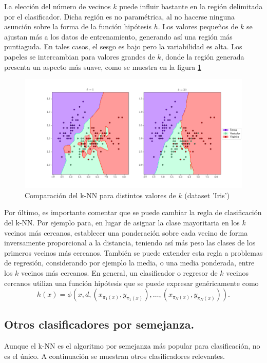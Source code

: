 \documentclass{book}
\begin{document}
La elección del número de vecinos $k$ puede influir bastante en la región delimitada por el clasificador. Dicha región es no paramétrica, al no hacerse ninguna asunción sobre la forma de la función hipótesis $h$. Los valores pequeños de $k$  se ajustan más a los datos de entrenamiento, generando así una región más puntiaguda. En tales casos, el sesgo es bajo pero la variabilidad es alta. Los papeles se intercambian para valores grandes de $k$, donde la región generada presenta un aspecto más suave, como se muestra en la figura \ref{fig:knn_comp_k}

\begin{figure}[h]
	\centering
	\includegraphics[width=\textwidth]{./images/compare_knn.png}
	\caption{Comparación del k-NN para distintos valores de $k$ (dataset 'Iris')} \label{fig:knn_comp_k}
\end{figure}

Por último, es importante comentar que se puede cambiar la regla de clasificación del k-NN. Por ejemplo para, en lugar de asignar la clase mayoritaria en los $k$ vecinos más cercanos, establecer una ponderación sobre cada vecino de forma inversamente proporcional a la distancia, teniendo así más peso las clases de los primeros vecinos más cercanos. También se puede extender esta regla a problemas de regresión, considerando por ejemplo la media, o una media ponderada, entre los $k$ vecinos más cercanos. En general, un clasificador o regresor de $k$ vecinos cercanos utiliza una función hipótesis que se puede expresar genéricamente como
\[ h(x) = \phi(x,d,(x_{\pi_1(x)},y_{\pi_1(x)}),\dots,(x_{\pi_N(x)},y_{\pi_N(x)})). \]

\subsection{Otros clasificadores por semejanza.}

Aunque el k-NN es el algoritmo por semejanza más popular para clasificación, no es el único. A continuación se muestran otros clasificadores relevantes.
\end{document}
